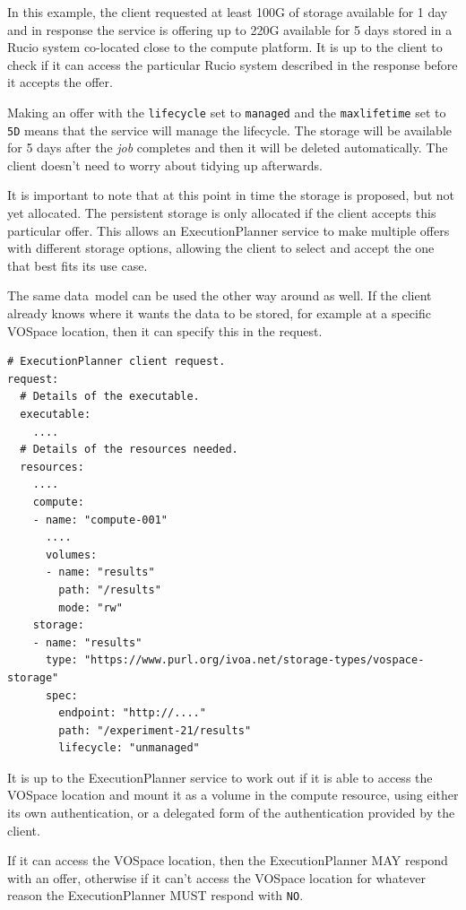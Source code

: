 \documentclass[11pt,a4paper]{ivoa}
\newcommand{\datamodel} {data~model}
\newcommand{\vospace} {VOSpace}
\newcommand{\execplanner} {ExecutionPlanner}
\newcommand{\rucio} {Rucio}
\newcommand{\codeword}[1] {\texttt{#1}}
\newcommand{\job} {\textit{job}}
\begin{document}
In this example, the client requested at least 100G of storage available for 1 day
and in response the service is offering up to 220G available for 5 days stored in a
\rucio{} system co-located close to the compute platform.
It is up to the client to check if it can access the particular \rucio{} system
described in the response before it accepts the offer.

Making an offer with the \codeword{lifecycle} set to \codeword{managed} and the
\codeword{maxlifetime} set to \codeword{5D}
means that the service will manage the lifecycle.
The storage will be available for 5 days after the \job{} completes and then it
will be deleted automatically.
The client doesn't need to worry about tidying up afterwards.

It is important to note that at this point in time the storage is proposed, but not yet allocated.
The persistent storage is only allocated if the client accepts this particular offer.
This allows an \execplanner{} service to make multiple offers with different storage options,
allowing the client to select and accept the one that best fits its use case.

The same \datamodel{} can be used the other way around as well.
If the client already knows where it wants the data to be stored, for example at a specific
\vospace{} location, then it can specify this in the request.

\begin{lstlisting}[]
# ExecutionPlanner client request.
request:
  # Details of the executable.
  executable:
    ....
  # Details of the resources needed.
  resources:
    ....
    compute:
    - name: "compute-001"
      ....
      volumes:
      - name: "results"
        path: "/results"
        mode: "rw"
    storage:
    - name: "results"
      type: "https://www.purl.org/ivoa.net/storage-types/vospace-storage"
      spec:
        endpoint: "http://...."
        path: "/experiment-21/results"
        lifecycle: "unmanaged"
\end{lstlisting}

It is up to the \execplanner{} service to work out if it is able to access the
\vospace{} location and mount it as a volume in the compute resource,
using either its own authentication, or a delegated form of the authentication
provided by the client.

If it can access the \vospace{} location, then the \execplanner{} MAY respond
with an offer, otherwise if it can't access the \vospace{} location for whatever
reason the \execplanner{} MUST respond with \codeword{NO}.
\end{document}
